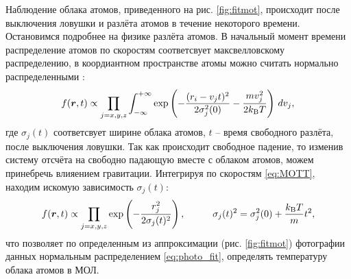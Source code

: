 Наблюдение облака атомов, приведенного на рис. \ref{fig:fitmot}, происходит после выключения ловушки и разлёта атомов в течение некоторого времени. Остановимся подробнее на физике разлёта атомов. В начальный момент времени распределение атомов по скоростям соответсвует максвелловскому распределению, в коордиантном пространстве атомы можно считать нормально распределенными \cite{vlad}:
\begin{equation}
    f(\boldsymbol{r}, t) \propto \prod_{j=x,y,z} \int_{-\infty}^{+\infty} 
    \exp\left(
        - \frac{(r_i-v_j t)^2}{2 \sigma_j^2(0)} - \frac{m v_j^2}{2 k_{\textnormal{B}} T}
    \right)
    \, d v_j,
    \label{eq:MOTT}
\end{equation}
где $\sigma_j(t)$ соответсвует ширине облака атомов, $t$ -- время свободного разлёта, после выключения ловушки. Так как происходит свободное падение, то изменив систему отсчёта на свободно падающую вместе с облаком атомов, можем принебречь влияением гравитации. Интегрируя по скоростям \eqref{eq:MOTT}, находим искомую зависимость $\sigma_j(t)$:
\begin{equation*}
    f(\vc{r},t) \propto \prod_{j=x,y,z} \exp\left(
        - \frac{r_j^2}{2 \sigma_j(t)^2}
    \right),
    \hspace{10 mm} 
    \sigma_j(t)^2 =  \sigma_j^2(0) + \frac{\kB T}{m} t^2,
\end{equation*}
что позволяет по определенным из аппроксимации (рис. \ref{fig:fitmot}) фотографии данных нормальным распределением \eqref{eq:photo_fit}, определять температуру облака атомов в МОЛ. 



